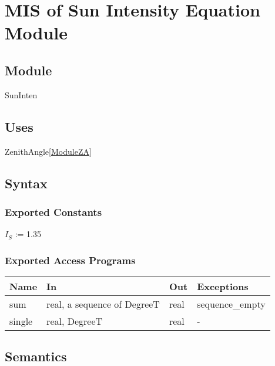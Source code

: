 \documentclass[12pt, titlepage]{article}
\begin{document}
\section{MIS of Sun Intensity Equation Module} \label{ModuleSI} 



\subsection{Module}
SunInten

\subsection{Uses}
ZenithAngle\ref{ModuleZA}

\subsection{Syntax}

\subsubsection{Exported Constants}
$I_{S}$ := 1.35\\

\subsubsection{Exported Access Programs}

\begin{center}
\begin{tabular}{p{2cm} p{5cm} p{3cm} p{2cm}}
\hline
\textbf{Name} & \textbf{In} & \textbf{Out} & \textbf{Exceptions} \\
\hline 
sum & real, a sequence of DegreeT & real & sequence\_empty \\
single & real, DegreeT & real & - \\

\hline
\end{tabular}
\end{center}


\subsection{Semantics}
\end{document}

